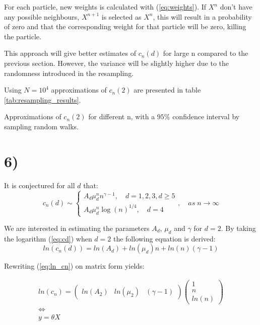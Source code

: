 \documentclass[a4paper]{article}
\begin{document}
For each particle, new weights is calculated with (\ref{eq:weights}). If $X^{n}$ don't have any possible neighbours, $X^{n+1}$ is selected as $X^n$, this will result in a probability of zero and that the corresponding weight for that particle will be zero, killing the particle.

This approach will give better estimates of $c_n(d)$ for large n compared to the previous section. However, the variance will be slightly higher due to the randomness introduced in the resampling.

Using $N = 10^4$ approximations of $c_n(2)$ are presented in table \ref{tab:resampling_results}.

\begin{table}[H]
    \centering
    \caption{Approximations of $c_n(2)$ for different n, with a $95\%$ confidence interval by sampling random walks.}
    \label{tab:resampling_results}
    
\end{table}

\section*{6)}

It is conjectured for all $d$ that:
\begin{equation}
    \label{eq:cd}
    c_n(d) \sim 
    \begin{cases}
        A_d\mu_d^nn^{\gamma-1}, \quad d = 1, 2, 3, d \geq 5 \\
        A_d\mu_d^n\log(n)^{1/4}, \quad d = 4
    \end{cases}, \quad as \; n \to \infty
\end{equation}

We are interested in estimating the parameters $A_d$, $\mu_d$ and $\gamma$ for $d = 2$.
By taking the logarithm (\ref{eq:cd}) when $d=2$ the following equation is derived:
\begin{equation}
    ln(c_n(d)) =  ln(A_d)+ln(\mu_d)n+ln(n)({\gamma-1})
    \label{eq:ln_cn}
\end{equation}

Rewriting (\ref{eq:ln_cn}) on matrix form yields:

\begin{equation}
    \begin{gathered}
        ln(c_n)=
        \begin{pmatrix}
            ln(A_2) & ln(\mu_2) & (\gamma -1)
        \end{pmatrix}
        \begin{pmatrix}
            1 \\
            n \\
            ln(n)
        \end{pmatrix}
        \\
        \iff
        \\
        y = \theta X
    \end{gathered}
\end{equation}
\end{document}
